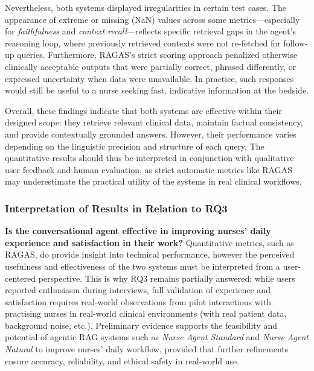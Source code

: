 Nevertheless, both systems displayed irregularities in certain test cases. The appearance of extreme or missing (NaN) values across some metrics—especially for \textit{faithfulness} and \textit{context recall}—reflects specific retrieval gaps in the agent’s reasoning loop, where previously retrieved contexts were not re-fetched for follow-up queries. Furthermore, RAGAS’s strict scoring approach penalized otherwise clinically acceptable outputs that were partially correct, phrased differently, or expressed uncertainty when data were unavailable. In practice, such responses would still be useful to a nurse seeking fast, indicative information at the bedside.

Overall, these findings indicate that both systems are effective within their designed scope: they retrieve relevant clinical data, maintain factual consistency, and provide contextually grounded answers. However, their performance varies depending on the linguistic precision and structure of each query. The quantitative results should thus be interpreted in conjunction with qualitative user feedback and human evaluation, as strict automatic metrics like RAGAS may underestimate the practical utility of the systems in real clinical workflows.

\subsubsection{Interpretation of Results in Relation to RQ3}
\textbf{Is the conversational agent effective in improving nurses’ daily experience and satisfaction in their work?}
Quantitative metrics, such as RAGAS, do provide insight into technical performance, however the perceived usefulness and effectiveness of the two systems must be interpreted from a user-centered perspective. This is why RQ3 remains partially answered: while users reported enthusiasm during interviews, full validation of experience and satisfaction requires real-world observations from pilot interactions with practising nurses in real-world clinical environments (with real patient data, background noise, etc.). Preliminary evidence supports the feasibility and potential of agentic RAG systems such as \textit{Nurse Agent Standard} and \textit{Nurse Agent Natural} to improve nurses’ daily workflow, provided that further refinements ensure accuracy, reliability, and ethical safety in real-world use.



